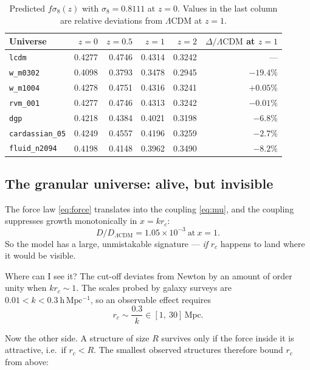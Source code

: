 \documentclass[11pt,a4paper]{article}
\theoremstyle{definition}
\newcommand{\Mpc}{\,\mathrm{Mpc}}
\begin{document}
\begin{table}[t]
\centering
\small
\caption{Predicted $f\sigma_8(z)$ with $\sigma_8 = 0.8111$ at $z=0$. Values
in the last column are relative deviations from $\Lambda$CDM at $z=1$.}
\label{tab:fsigma8}
\begin{tabular}{@{}lrrrrr@{}}
\toprule
Universe & $z=0$ & $z=0.5$ & $z=1$ & $z=2$ & $\Delta/\Lambda\mathrm{CDM}$ at $z{=}1$ \\
\midrule
\texttt{lcdm}          & 0.4277 & 0.4746 & 0.4314 & 0.3242 & --- \\
\texttt{w\_m0302}      & 0.4098 & 0.3793 & 0.3478 & 0.2945 & $-19.4\%$ \\
\texttt{w\_m1004}      & 0.4278 & 0.4751 & 0.4316 & 0.3241 & $+0.05\%$ \\
\texttt{rvm\_001}      & 0.4277 & 0.4746 & 0.4313 & 0.3242 & $-0.01\%$ \\
\texttt{dgp}           & 0.4218 & 0.4384 & 0.4021 & 0.3198 & $-6.8\%$ \\
\texttt{cardassian\_05}& 0.4249 & 0.4557 & 0.4196 & 0.3259 & $-2.7\%$ \\
\texttt{fluid\_n2094}  & 0.4198 & 0.4148 & 0.3962 & 0.3490 & $-8.2\%$ \\
\bottomrule
\end{tabular}
\end{table}

\subsection{The granular universe: alive, but invisible}
\label{sec:granular}

The force law \eqref{eq:force} translates into the coupling
\eqref{eq:mu}, and the coupling suppresses growth monotonically in $x = k r_c$:
\begin{equation}
D/D_{\Lambda\mathrm{CDM}} = 1.05\times10^{-3}\ \text{at}\ x = 1 .
\end{equation}
So the model has a large, unmistakable signature --- \emph{if} $r_c$ happens
to land where it would be visible.

Where can I see it? The cut-off deviates from Newton by an amount of order
unity when $k r_c \sim 1$. The scales probed by galaxy surveys are
$0.01 < k < 0.3\ \mathrm{h\,Mpc^{-1}}$, so an observable effect requires
\begin{equation}
r_c \sim \frac{0.3}{k} \in [1,\ 30]\Mpc .
\label{eq:rcwindow}
\end{equation}

Now the other side. A structure of size $R$ survives only if the force inside
it is attractive, i.e.\ if $r_c < R$. The smallest observed structures
therefore bound $r_c$ from above:
\end{document}
